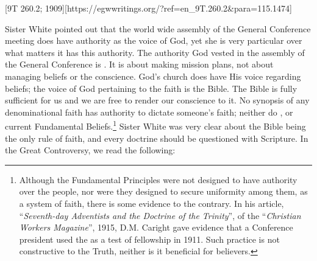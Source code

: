 [9T 260.2; 1909][https://egwwritings.org/?ref=en\_9T.260.2&para=115.1474]


Sister White pointed out that the world wide assembly of the General Conference meeting does have authority as the voice of God, yet she is very particular over what matters it has this authority. The authority God vested in the assembly of the General Conference is . It is about making mission plans, not about managing beliefs or the conscience. God’s church does have His voice regarding beliefs; the voice of God pertaining to the faith is the Bible. The Bible is fully sufficient for us and we are free to render our conscience to it. No synopsis of any denominational faith has authority to dictate someone's faith; neither do , or current Fundamental Beliefs.\footnote{Although the Fundamental Principles were not designed to have authority over the people, nor were they designed to secure uniformity among them, as a system of faith, there is some evidence to the contrary. In his article, “\textit{Seventh-day Adventists and the Doctrine of the Trinity}”, of the “\textit{Christian Workers Magazine}”, 1915, D.M. Caright gave evidence that a Conference president used the  as a test of fellowship in 1911. Such practice is not constructive to the Truth, neither is it beneficial for believers.} Sister White was very clear about the Bible being the only rule of faith, and every doctrine should be questioned with Scripture. In the Great Controversy, we read the following:


